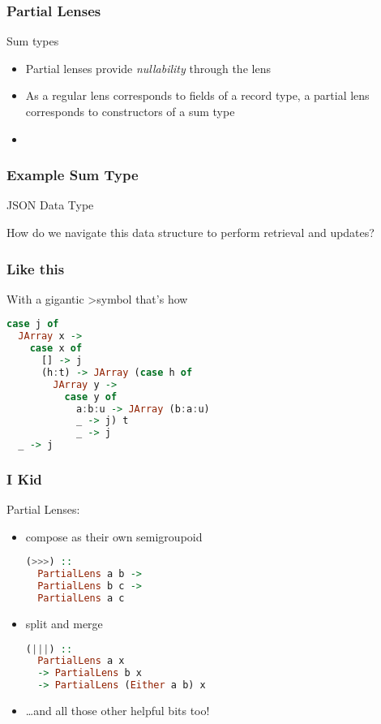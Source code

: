 \begin{frame}
\frametitle{Partial Lenses}

\begin{block}{Sum types}
\begin{itemize}
\item Partial lenses provide \emph{nullability} through the lens
\item As a regular lens corresponds to fields of a record type, a partial lens corresponds to constructors of a sum type
\item 
\end{itemize}
\end{block}

\end{frame}

\begin{frame}
\frametitle{Example Sum Type}

\begin{block}{JSON Data Type}

How do we navigate this data structure to perform retrieval and updates?
\end{block}

\end{frame}

\begin{frame}[fragile]
\frametitle{Like this}

\begin{block}{With a gigantic \textgreater symbol that's how}
\begin{lstlisting}[language=haskell]
case j of
  JArray x -> 
    case x of
      [] -> j
      (h:t) -> JArray (case h of 
        JArray y ->
          case y of
            a:b:u -> JArray (b:a:u)
            _ -> j) t
            _ -> j
  _ -> j
\end{lstlisting}
\end{block}

\end{frame}

\begin{frame}[fragile]
\frametitle{I Kid}

\begin{block}{Partial Lenses:}
\begin{itemize}
\item compose as their own semigroupoid
\begin{lstlisting}[language=haskell]
(>>>) ::
  PartialLens a b ->
  PartialLens b c ->
  PartialLens a c
\end{lstlisting}
\item split and merge
\begin{lstlisting}[language=haskell]
(|||) ::
  PartialLens a x
  -> PartialLens b x
  -> PartialLens (Either a b) x
\end{lstlisting}
\item \ldots and all those other helpful bits too!
\end{itemize}
\end{block}

\end{frame}

